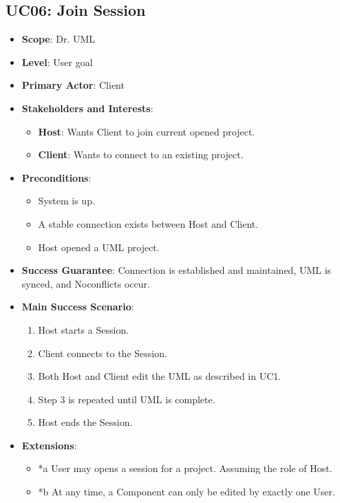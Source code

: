 \documentclass[12pt]{article}
\begin{document}
    \subsection{UC06: Join Session}
    \begin{itemize}
        \item \textbf{Scope}: Dr. UML
        \item \textbf{Level}: User goal
        \item \textbf{Primary Actor}: Client
        \item \textbf{Stakeholders and Interests}:
        \begin{itemize}
            \item \textbf{Host}: Wants Client to join current opened project.
            \item \textbf{Client}: Wants to connect to an existing project.
        \end{itemize}
        \item \textbf{Preconditions}:
        \begin{itemize}
            \item System is up.
            \item A stable connection exists between Host and Client.
            \item Host opened a UML project.
        \end{itemize}
        \item \textbf{Success Guarantee}: Connection is established and maintained, UML is synced, and Noconflicts occur.
        \item \textbf{Main Success Scenario}:
        \begin{enumerate}
            \item Host starts a Session.
            \item Client connects to the Session.
            \item Both Host and Client edit the UML as described in UC1.
            \item Step 3 is repeated until UML is complete.
            \item Host ends the Session.
        \end{enumerate}
        \item \textbf{Extensions}:
        \begin{itemize}
            \item *a User may opens a session for a project. Assuming the role of Host.
            \item *b At any time, a Component can only be edited by exactly one User.

\end{itemize}
\end{itemize}
\end{document}
